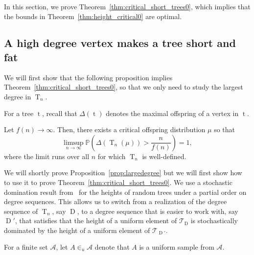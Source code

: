 \documentclass[AHL,Unicode,longabstracts,published]{cedram}
\renewcommand{\P}{\mathbb{P}}
\DeclareMathOperator{\tree}{t}
\DeclareMathOperator{\rtree}{T}
\DeclareMathOperator{\Dseq}{D}
\newcommand\cA{\mathcal{A}}
\newcommand\cT{\mathcal{T}}
\begin{document}
In this section, we prove Theorem~\ref{thm:critical_short_trees0}, which implies that the bounds in Theorem~\ref{thm:height_critical0} are optimal.


\subsection{A high degree vertex makes a tree short and fat}

We will first show that the following proposition implies Theorem~\ref{thm:critical_short_trees0}, so that we only need to study the largest degree in $\rtree_n$.

For a tree $\tree$, recall that $\Delta(\tree)$ denotes the maximal offspring of a vertex in $\tree$.


\begin{prop}\label{prop:largedegree}
Let $f(n)\to \infty$. Then, there exists a critical offspring distribution $\mu$ so that
\[
\limsup_{n\to\infty}\P\left(\Delta(\rtree_n(\mu))>\frac{n}{f(n)}\right)=1,
\]
where the limit runs over all $n$ for which $\rtree_n$ is well-defined.
\end{prop}


We will shortly prove Proposition~\ref{prop:largedegree} but we will first show how to use it to prove Theorem~\ref{thm:critical_short_trees0}. We use a stochastic domination result from~\cite{AD22} for the heights of random trees under a partial order on degree sequences. This allows us to switch from a realization of the degree sequence of $\rtree_n$, say $\Dseq$, to a degree sequence that is easier to work with, say $\Dseq '$, that satisfies that the height of a uniform element of $\cT_{\Dseq}$ is stochastically dominated by the height of a uniform element of $\cT_{\Dseq '}$.

For a finite set $\cA$, let $A\in_u\cA$ denote that $A$ is a uniform sample from $\cA$.
\end{document}
